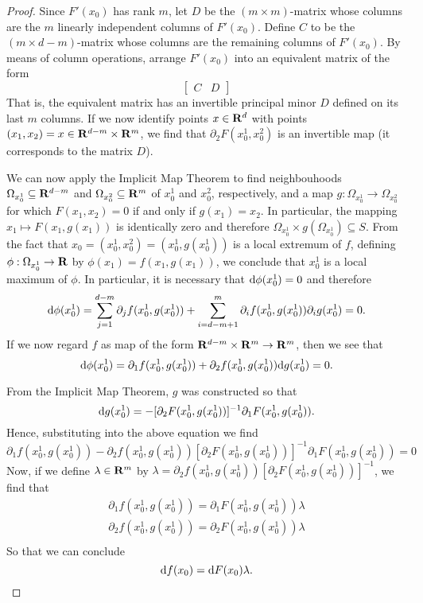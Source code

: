 \begin{proof}
  Since \(F'(x_0)\) has rank \(m\), let \(D\) be the \((m \times m)\)-matrix whose
  columns are the \(m\) linearly independent columns of \(F'(x_0)\). Define
  \(C\) to be the \((m \times d - m)\)-matrix whose columns are the remaining columns
  of \(F'(x_0)\). By means of column operations, arrange \(F'(x_0)\) into an
  equivalent matrix of the form
  \[
    \begin{bmatrix}
      C & D
    \end{bmatrix}
  \]
  That is, the equivalent matrix has an invertible principal minor \(D\) defined
  on its last \(m\) columns. If we now identify points \(x \in \mathbf{R}^d\) with points
  \((x_1, x_2) = x \in \mathbf{R}^{d-m} \times \mathbf{R}^m\), we find that \(\partial_2 F(x_0^1, x_0^2)\) is an
  invertible map (it corresponds to the matrix \(D\)).

  We can now apply the Implicit Map Theorem to find neighbouhoods \(\Omega_{x_{0}^1}
  \subseteq \mathbf{R}^{d-m}\) and \(\Omega_{x_0^2} \subseteq \mathbf{R}^m\) of \(x_0^1\) and \(x_0^2\), respectively,
  and a map \(g: \Omega_{x_0^1} \to \Omega_{x_0^2}\) for which \(F(x_{1}, x_2) = 0\) if and
  only if \(g(x_1) = x_2\). In particular, the mapping \(x_1 \mapsto F(x_1, g(x_1))\)
  is identically zero and therefore \(\Omega_{x_0^1} \times g(\Omega_{x_0^1}) \subseteq S\). From the
  fact that \(x_0 = (x_0^1, x_0^2) = (x_0^1, g(x_0^1))\) is a local extremum of
  \(f\), defining \(\phi: \Omega_{x_0^{1}} \to \mathbf{R}\) by \(\phi(x_1) = f(x_1, g(x_1))\), we
  conclude that \(x_0^1\) is a local maximum of \(\phi\). In particular, it is
  necessary that \(\mathrm{d} \phi(x_0^1) = 0\) and therefore
  \[
    \mathrm{d} \phi(x_0^{1}) = \sum_{j=1}^{d-m} \partial_j f(x_0^1, g(x_0^1)) + \sum_{i = d - m +
      1}^{m} \partial_i f(x_0^1, g(x_0^1)) \partial_i g(x_0^1) = 0.
  \]
  If we now regard \(f\) as map of the form \(\mathbf{R}^{d-m} \times \mathbf{R}^m \to \mathbf{R}^m\), then we
  see that
  \[
    \mathrm{d} \phi(x_0^1) = \partial_1 f(x_0^1, g(x_0^1)) + \partial_{2} f(x_0^1, g(x_0^1)) \mathrm{d}
    g(x_0^1) = 0.
  \]

  From the Implicit Map Theorem, \(g\) was constructed so that
  \[
    \mathrm{d} g(x_0^1) = - [\partial_2F(x_0^1, g(x_0^1))]^{-1} \partial_1 F(x_0^1, g(x_{0}^1)).
  \]
  Hence, substituting into the above equation we find
  \[
    \partial_1 f(x_0^1, g(x_0^1)) - \partial_2 f(x_0^1, g(x_0^1)) [\partial_2 F(x_0^1,
    g(x_0^1))]^{-1} \partial_1 F(x_0^1, g(x_0^1)) = 0
  \]
  Now, if we define \(\lambda \in \mathbf{R}^m\) by \(\lambda = \partial_2f(x_0^{1}, g(x_{0}^{1})) [\partial_2
  F(x_{0}^1, g(x_0^1))]^{-1}\), we find that
  \begin{gather*}
    \partial_1 f(x_0^{1}, g(x_0^1)) = \partial_1 F(x_0^1, g(x_0^1)) \lambda \\
    \partial_2 f(x_0^{1}, g(x_0^1)) = \partial_2 F(x_0^1, g(x_0^1)) \lambda \\
  \end{gather*}
  So that we can conclude
  \[
    \mathrm{d} f(x_0) = \mathrm{d} F(x_0) \lambda.
  \]
\end{proof}

